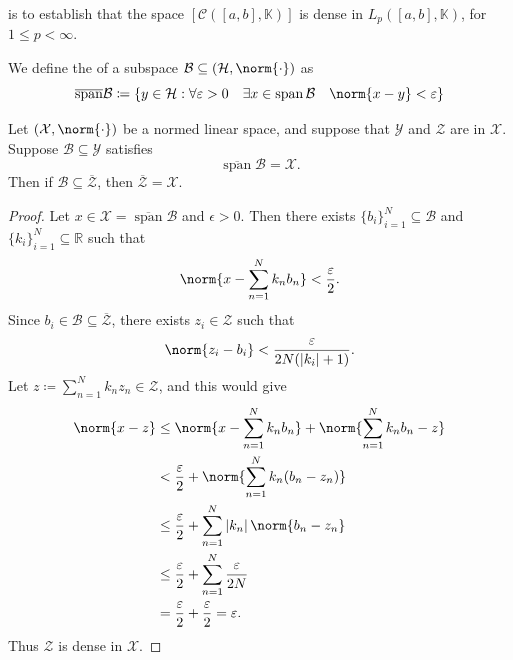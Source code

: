 \documentclass[notoc,notitlepage]{tufte-book}
\DeclareMathOperator{\Span}{span}
\begin{document}
 is to establish that the space
$[\mathcal{C}([a, b], \mathbb{K})]$ is dense in $L_p([a, b], \mathbb{K})$,
for $1 \leq p < \infty$.

\begin{defn}\label{defn:closed_span}
  We define the  of a subspace
  $\mathcal{B} \subseteq (\mathcal{H}, \norm{\cdot})$ as
  \begin{equation*}
    \overline{\Span} \mathcal{B}
    \coloneqq \{ y \in \mathcal{H} :
        \forall \epsilon > 0 \quad \exists x \in \Span \mathcal{B} \quad
        \norm{x - y} < \epsilon
      \}
  \end{equation*}
\end{defn}


\begin{lemma}[Lemma 6.31]\label{lemma:lemma_6_31}
  Let $(\mathcal{X}, \norm{\cdot})$ be a normed linear space,
  and suppose that $\mathcal{Y}$ and $\mathcal{Z}$ are 
  in $\mathcal{X}$. Suppose $\mathcal{B} \subseteq \mathcal{Y}$ satisfies
  \begin{equation*}
    \overline{\Span} \mathcal{B} = \mathcal{X}.
  \end{equation*}
  Then if $\mathcal{B} \subseteq \overline{\mathcal{Z}}$, 
  then $\overline{\mathcal{Z}} = \mathcal{X}$.
\end{lemma}

\begin{proof}
  Let $x \in \mathcal{X} = \overline{\Span} \mathcal{B}$ and $\epsilon > 0$.
  Then there exists $\{ b_i \}_{i=1}^{N} \subseteq \mathcal{B}$ and
  $\{ k_i \}_{i=1}^{N} \subseteq \mathbb{R}$ such that
  \begin{equation*}
    \norm{ x - \sum_{n=1}^{N} k_n b_n } < \frac{\epsilon}{2}.
  \end{equation*}
  Since $b_i \in \mathcal{B} \subseteq \overline{\mathcal{Z}}$,
  there exists $z_i \in \mathcal{Z}$ such that
  \begin{equation*}
    \norm{z_i - b_i} < \frac{\epsilon}{2N(\abs{k_i} + 1)}.
  \end{equation*}
  Let $z \coloneqq \sum_{n=1}^{N} k_n z_n \in \mathcal{Z}$,
  and this would give
  \begin{align*}
    \norm{x - z}
    &\leq \norm{ x - \sum_{n=1}^{N} k_n b_n } + \norm{ \sum_{n=1}^{N} k_n b_n -
      z} \\
    &< \frac{\epsilon}{2} + \norm{ \sum_{n=1}^{N} k_n (b_n - z_n) } \\
    &\leq \frac{\epsilon}{2} + \sum_{n=1}^{N} \abs{k_n} \norm{b_n - z_n} \\
    &\leq \frac{\epsilon}{2} + \sum_{n=1}^{N} \frac{\epsilon}{2N} \\
    &= \frac{\epsilon}{2} + \frac{\epsilon}{2} = \epsilon.
  \end{align*}
  Thus $\mathcal{Z}$ is dense in $\mathcal{X}$.
\end{proof}
\end{document}
